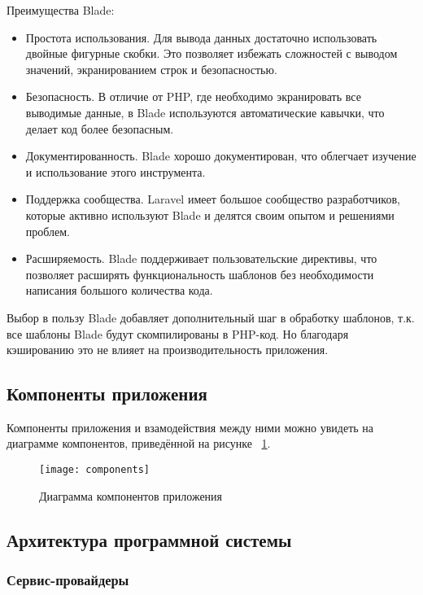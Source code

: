 Преимущества Blade:
\begin{itemize}
	\item Простота использования. Для вывода данных достаточно использовать двойные фигурные скобки. Это позволяет избежать сложностей с выводом значений, экранированием строк и безопасностью.
	\item Безопасность. В отличие от PHP, где необходимо экранировать все выводимые данные, в Blade используются автоматические кавычки, что делает код более безопасным.
	\item Документированность. Blade хорошо документирован, что облегчает изучение и использование этого инструмента.
	\item Поддержка сообщества. Laravel имеет большое сообщество разработчиков, которые активно используют Blade и делятся своим опытом и решениями проблем.
	\item Расширяемость. Blade поддерживает пользовательские директивы, что позволяет расширять функциональность шаблонов без необходимости написания большого количества кода.
\end{itemize}

Выбор в пользу Blade добавляет дополнительный шаг в обработку шаблонов, т.к. все шаблоны Blade будут скомпилированы в PHP-код. Но благодаря кэшированию это не влияет на производительность приложения.

\subsection{Компоненты приложения}
Компоненты приложения и взамодействия между ними можно увидеть на диаграмме компонентов, приведённой на рисунке ~\ref{components:image}.
\begin{figure}[h!]
	\texttt{[image: components]}
	\caption{Диаграмма компонентов приложения}
	\label{components:image}
\end{figure}

\subsection{Архитектура программной системы}

\subsubsection{Сервис-провайдеры}

